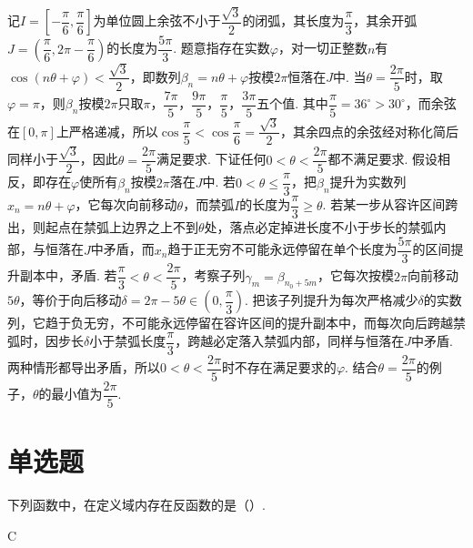 \begin{solution}
记\(I=\left[ -\dfrac{\pi}{6},\dfrac{\pi}{6} \right]\)为单位圆上余弦不小于\(\dfrac{\sqrt{3}}{2}\)的闭弧，其长度为\(\dfrac{\pi}{3}\)，其余开弧\(J=\left( \dfrac{\pi}{6},2\pi-\dfrac{\pi}{6} \right)\)的长度为\(\dfrac{5\pi}{3}\). 题意指存在实数\(\varphi\)，对一切正整数\(n\)有\(\cos\left( n\theta+\varphi \right)<\dfrac{\sqrt{3}}{2}\)，即数列\(\beta_n=n\theta+\varphi\)按模\(2\pi\)恒落在\(J\)中. 当\(\theta=\dfrac{2\pi}{5}\)时，取\(\varphi=\pi\)，则\(\beta_n\)按模\(2\pi\)只取\(\pi\)，\(\dfrac{7\pi}{5}\)，\(\dfrac{9\pi}{5}\)，\(\dfrac{\pi}{5}\)，\(\dfrac{3\pi}{5}\)五个值. 其中\(\dfrac{\pi}{5}=36^\circ>30^\circ\)，而余弦在\(\left[ 0,\pi \right]\)上严格递减，所以\(\cos\dfrac{\pi}{5}<\cos\dfrac{\pi}{6}=\dfrac{\sqrt{3}}{2}\)，其余四点的余弦经对称化简后同样小于\(\dfrac{\sqrt{3}}{2}\)，因此\(\theta=\dfrac{2\pi}{5}\)满足要求. 下证任何\(0<\theta<\dfrac{2\pi}{5}\)都不满足要求. 假设相反，即存在\(\varphi\)使所有\(\beta_n\)按模\(2\pi\)落在\(J\)中. 若\(0<\theta\le\dfrac{\pi}{3}\)，把\(\beta_n\)提升为实数列\(x_n=n\theta+\varphi\)，它每次向前移动\(\theta\)，而禁弧\(I\)的长度为\(\dfrac{\pi}{3}\ge\theta\). 若某一步从容许区间跨出，则起点在禁弧上边界之上不到\(\theta\)处，落点必定掉进长度不小于步长的禁弧内部，与恒落在\(J\)中矛盾，而\(x_n\)趋于正无穷不可能永远停留在单个长度为\(\dfrac{5\pi}{3}\)的区间提升副本中，矛盾. 若\(\dfrac{\pi}{3}<\theta<\dfrac{2\pi}{5}\)，考察子列\(\gamma_m=\beta_{n_0+5m}\)，它每次按模\(2\pi\)向前移动\(5\theta\)，等价于向后移动\(\delta=2\pi-5\theta\in\left( 0,\dfrac{\pi}{3} \right)\). 把该子列提升为每次严格减少\(\delta\)的实数列，它趋于负无穷，不可能永远停留在容许区间的提升副本中，而每次向后跨越禁弧时，因步长\(\delta\)小于禁弧长度\(\dfrac{\pi}{3}\)，跨越必定落入禁弧内部，同样与恒落在\(J\)中矛盾. 两种情形都导出矛盾，所以\(0<\theta<\dfrac{2\pi}{5}\)时不存在满足要求的\(\varphi\). 结合\(\theta=\dfrac{2\pi}{5}\)的例子，\(\theta\)的最小值为\(\dfrac{2\pi}{5}\).
\end{solution}
\section{单选题}

\begin{problem}
下列函数中，在定义域内存在反函数的是（\quad）.
\end{problem}

\begin{answer}
C
\end{answer}

